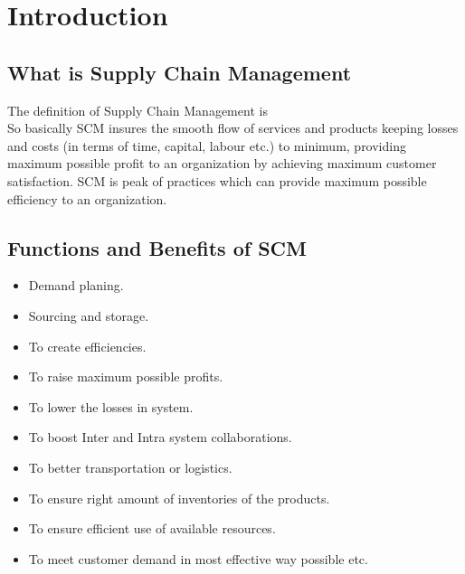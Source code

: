 \documentclass[12pt, a4paper]{report}
\begin{document}
\pagestyle{plain}
\def\title{Internet of Things in Supply Chain Management}
\def\what{IE 694: Seminar Report}
\def\who{Inderjeet Singh (173190001)}
\def\guide{Prof. Vishnu Narayanan}

\titlpage
\tableofcontents
\listoffigures


\newpage
{}





\chapter{Introduction}
\section{What is Supply Chain Management}
The definition of Supply Chain Management is 
\cite{scm}
\\ So basically SCM insures the smooth flow of services and products keeping losses and costs (in terms of time, capital, labour etc.) to minimum, providing maximum possible profit to an organization by achieving maximum customer satisfaction. SCM is peak of practices which can provide maximum possible efficiency to an organization.


\section{Functions and Benefits of SCM}
\begin{itemize}
    \item Demand planing.
    \item Sourcing and storage.
    \item To create efficiencies.
    \item To raise maximum possible profits.
    \item To lower the losses in system.
    \item To boost Inter and Intra system collaborations.
    \item To better transportation or logistics.
    \item To ensure right amount of inventories of the products.
    \item To ensure efficient use of available resources.
    \item To meet customer demand in most effective way possible etc.
\end{itemize}
\end{document}
